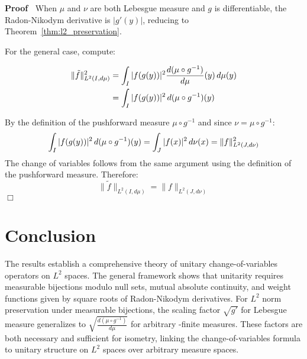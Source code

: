 \documentclass{article}
\newenvironment{proof}{\noindent\textbf{Proof\ }}{\hspace*{\fill}$\Box$\medskip}
\begin{document}
\begin{proof}
  When $\mu$ and $\nu$ are both Lebesgue measure and $g$ is differentiable,
  the Radon-Nikodym derivative is $|g' (y) |$, reducing to
  Theorem~\ref{thm:l2_preservation}.
  
  For the general case, compute:
  
  \begin{align}
    \| \tilde{f} \|_{L^2 (I, d \mu)}^2 & = \int_I |f (g (y)) |^2 \frac{d (\mu
    \circ g^{- 1})}{d \mu} (y)  \hspace{0.17em} d \mu (y) 
    \label{eq:general_norm_calc1}\\
    & = \int_I |f (g (y)) |^2  \hspace{0.17em} d (\mu \circ g^{- 1}) (y) 
    \label{eq:general_norm_calc2}
  \end{align}
  
  By the definition of the pushforward measure $\mu \circ g^{- 1}$ and since
  $\nu = \mu \circ g^{- 1}$:
  \begin{equation}
    \label{eq:pushforward_change} \int_I |f (g (y)) |^2 \hspace{0.17em} d (\mu
    \circ g^{- 1}) (y) = \int_J |f (x) |^2  \hspace{0.17em} d \nu (x) =
    \|f\|_{L^2 (J, d \nu)}^2
  \end{equation}
  The change of variables follows from the same argument using the definition
  of the pushforward measure. Therefore:
  \begin{equation}
    \label{eq:general_final_norm} \| \tilde{f} \|_{L^2 (I, d \mu)} =
    \|f\|_{L^2 (J, d \nu)}
  \end{equation}
\end{proof}

\section{Conclusion}

The results establish a comprehensive theory of unitary change-of-variables
operators on $L^2$ spaces. The general framework shows that unitarity requires
measurable bijections modulo null sets, mutual absolute continuity, and weight
functions given by square roots of Radon-Nikodym derivatives. For $L^2$ norm
preservation under measurable bijections, the scaling factor $\sqrt{g'}$ for
Lebesgue measure generalizes to $\sqrt{\frac{d (\mu \circ g^{- 1})}{d \mu}}$
for arbitrary {\sigma}-finite measures. These factors are both necessary and
sufficient for isometry, linking the change-of-variables formula to unitary
structure on $L^2$ spaces over arbitrary measure spaces.
\end{document}
